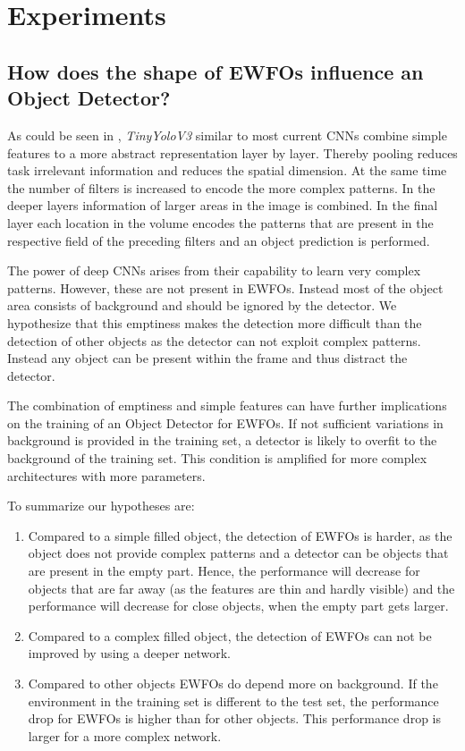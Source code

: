 \chapter{Experiments}

\section{How does the shape of \acp{EWFO} influence an Object Detector?}

As could be seen in , \textit{TinyYoloV3} similar to most current \acp{CNN} combine simple features to a more abstract representation layer by layer. Thereby pooling reduces task irrelevant information and reduces the spatial dimension. At the same time the number of filters is increased to encode the more complex patterns. In the deeper layers information of larger areas in the image is combined. In the final layer each location in the volume encodes the patterns that are present in the respective field of the preceding filters and an object prediction is performed.

The power of deep \acp{CNN} arises from their capability to learn very complex patterns. However, these are not present in \acp{EWFO}. Instead most of the object area consists of background and should be ignored by the detector. We hypothesize that this emptiness makes the detection more difficult than the detection of other objects as the detector can not exploit complex patterns. Instead any object can be present within the frame and thus distract the detector.

The combination of emptiness and simple features can have further implications on the training of an Object Detector for \acp{EWFO}. If not sufficient variations in background is provided in the training set, a detector is likely to overfit to the background of the training set. This condition is amplified for more complex architectures with more parameters.

To summarize our hypotheses are:
\begin{enumerate}
	\item Compared to a simple filled object, the detection of \acp{EWFO} is harder, as the object does not provide complex patterns and a detector can be objects that are present in the empty part. Hence, the performance will decrease for objects that are far away (as the features are thin and hardly visible) and the performance will decrease for close objects, when the empty part gets larger.
	\item Compared to a complex filled object, the detection of \acp{EWFO} can not be improved by using a deeper network.
	\item Compared to other objects \acp{EWFO} do depend more on background. If the environment in the training set is different to the test set, the performance drop for \acp{EWFO} is higher than for other objects. This performance drop is larger for a more complex network.
\end{enumerate}

